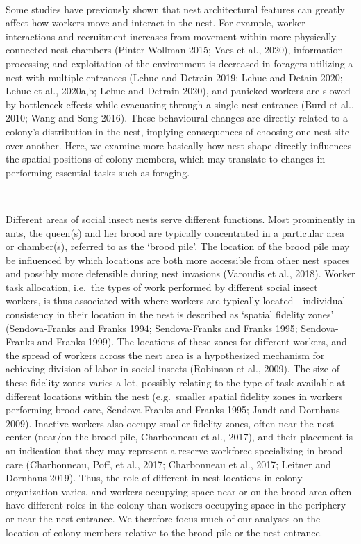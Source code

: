 \documentclass[3p]{elsarticle} %
\begin{document}
~

Some studies have previously shown that nest architectural features can
greatly affect how workers move and interact in the nest. For example,
worker interactions and recruitment increases from movement within more
physically connected nest chambers (Pinter-Wollman 2015; Vaes et al.,
2020), information processing and exploitation of the environment is
decreased in foragers utilizing a nest with multiple entrances (Lehue
and Detrain 2019; Lehue and Detain 2020; Lehue et al., 2020a,b; Lehue
and Detrain 2020), and panicked workers are slowed by bottleneck effects
while evacuating through a single nest entrance (Burd et al., 2010; Wang
and Song 2016). These behavioural changes are directly related to a
colony's distribution in the nest, implying consequences of choosing one
nest site over another. Here, we examine more basically how nest shape
directly influences the spatial positions of colony members, which may
translate to changes in performing essential tasks such as foraging.

~

Different areas of social insect nests serve different functions. Most
prominently in ants, the queen(s) and her brood are typically
concentrated in a particular area or chamber(s), referred to as the
`brood pile'. The location of the brood pile may be influenced by which
locations are both more accessible from other nest spaces and possibly
more defensible during nest invasions (Varoudis et al., 2018). Worker
task allocation, i.e.~the types of work performed by different social
insect workers, is thus associated with where workers are typically
located - individual consistency in their location in the nest is
described as `spatial fidelity zones' (Sendova-Franks and Franks 1994;
Sendova-Franks and Franks 1995; Sendova-Franks and Franks 1999). The
locations of these zones for different workers, and the spread of
workers across the nest area is a hypothesized mechanism for achieving
division of labor in social insects (Robinson et al., 2009). The size of
these fidelity zones varies a lot, possibly relating to the type of task
available at different locations within the nest (e.g.~smaller spatial
fidelity zones in workers performing brood care, Sendova-Franks and
Franks 1995; Jandt and Dornhaus 2009). Inactive workers also occupy
smaller fidelity zones, often near the nest center (near/on the brood
pile, Charbonneau et al., 2017), and their placement is an indication
that they may represent a reserve workforce specializing in brood care
(Charbonneau, Poff, et al., 2017; Charbonneau et al., 2017; Leitner and
Dornhaus 2019). Thus, the role of different in-nest locations in colony
organization varies, and workers occupying space near or on the brood
area often have different roles in the colony than workers occupying
space in the periphery or near the nest entrance. We therefore focus
much of our analyses on the location of colony members relative to the
brood pile or the nest entrance.
\end{document}
